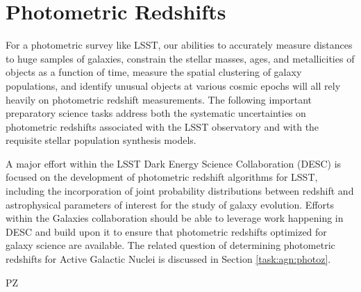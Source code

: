 \section{Photometric Redshifts}\label{sec:tasks:photo_z}  
{\justify
For a photometric survey like LSST, our abilities to accurately measure distances to huge samples of galaxies, constrain the stellar masses, ages, and metallicities of objects as a function of time, measure the spatial clustering of galaxy populations, and identify unusual objects at various cosmic epochs will all rely heavily on
photometric redshift measurements.
The following important preparatory science tasks address both the systematic uncertainties on photometric redshifts associated with the LSST observatory and with the requisite
stellar population synthesis models.

A major effort within the LSST Dark Energy Science Collaboration (DESC) is focused on the development of photometric redshift algorithms for LSST, including the incorporation of joint probability distributions between redshift and astrophysical parameters of interest for the study of galaxy evolution.  Efforts within the Galaxies collaboration should be able to leverage work happening in DESC and build upon it to ensure that photometric redshifts optimized for galaxy science are available.
The related question of determining photometric redshifts for Active Galactic Nuclei is discussed in Section \ref{task:agn:photoz}.

\begin{tasklist}{PZ}

\end{tasklist}}
